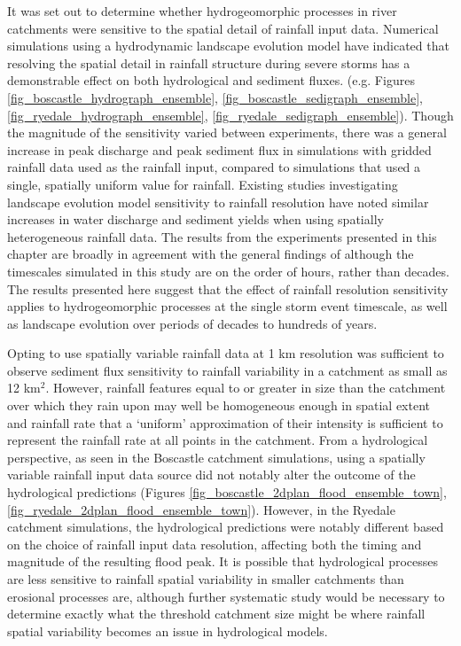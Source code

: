 It was set out to determine whether hydrogeomorphic processes in river catchments were sensitive to the spatial detail of rainfall input data. Numerical simulations using a hydrodynamic landscape evolution model have indicated that resolving the spatial detail in rainfall structure during severe storms has a demonstrable effect on both hydrological and sediment fluxes. (e.g. Figures \ref{fig_boscastle_hydrograph_ensemble}, \ref{fig_boscastle_sedigraph_ensemble}, \ref{fig_ryedale_hydrograph_ensemble}, \ref{fig_ryedale_sedigraph_ensemble}). Though the magnitude of the sensitivity varied between experiments, there was a general increase in peak discharge and peak sediment flux in simulations with gridded rainfall data used as the rainfall input, compared to simulations that used a single, spatially uniform value for rainfall. Existing studies investigating landscape evolution model sensitivity to rainfall resolution \citep{coulthard2016sensitivity} have noted similar increases in water discharge and sediment yields when using spatially heterogeneous rainfall data. The results from the experiments presented in this chapter are broadly in agreement with the general findings of \citet{coulthard2016sensitivity} although the timescales simulated in this study are on the order of hours, rather than decades. The results presented here suggest that the effect of rainfall resolution sensitivity applies to hydrogeomorphic processes at the single storm event timescale, as well as landscape evolution over periods of decades to hundreds of years.

Opting to use spatially variable rainfall data at 1 km resolution was sufficient to observe sediment flux sensitivity to rainfall variability in a catchment as small as 12 km\(^2\). However, rainfall features equal to or greater in size than the catchment over which they rain upon may well be homogeneous enough in spatial extent and rainfall rate that a `uniform' approximation of their intensity is sufficient to represent the rainfall rate at all points in the catchment. From a hydrological perspective, as seen in the Boscastle catchment simulations, using a spatially variable rainfall input data source did not notably alter the outcome of the hydrological predictions (Figures \ref{fig_boscastle_2dplan_flood_ensemble_town}, \ref{fig_ryedale_2dplan_flood_ensemble_town}). However, in the Ryedale catchment simulations, the hydrological predictions were notably different based on the choice of rainfall input data resolution, affecting both the timing and magnitude of the resulting flood peak. It is possible that hydrological processes are less sensitive to rainfall spatial variability in smaller catchments than erosional processes are, although further systematic study would be necessary to determine exactly what the threshold catchment size might be where rainfall spatial variability becomes an issue in hydrological models.
%

